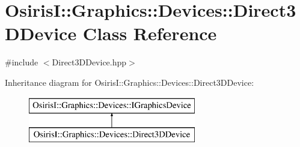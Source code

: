 \hypertarget{class_osiris_i_1_1_graphics_1_1_devices_1_1_direct3_d_device}{\section{Osiris\-I\-:\-:Graphics\-:\-:Devices\-:\-:Direct3\-D\-Device Class Reference}
\label{class_osiris_i_1_1_graphics_1_1_devices_1_1_direct3_d_device}
}


{\ttfamily \#include $<$Direct3\-D\-Device.\-hpp$>$}

Inheritance diagram for Osiris\-I\-:\-:Graphics\-:\-:Devices\-:\-:Direct3\-D\-Device\-:\begin{figure}[H]
\begin{center}
\leavevmode
\includegraphics[height=2.000000cm]{class_osiris_i_1_1_graphics_1_1_devices_1_1_direct3_d_device}
\end{center}
\end{figure}
